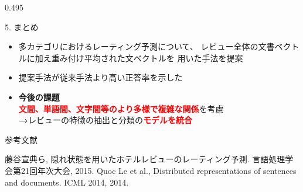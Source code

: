 \documentclass[unicode,10pt]{beamer}
\newcommand{\mycolumnwidth}{0.495\textwidth}
\newcommand{\arrow}{\textcolor{ttiblue}{\textbf{→}}\hspace{1ex}}
\newcommand{\itemtitle}[1]{\textbf{#1}\\}
\newcommand{\fire}[1]{\textcolor{red}{\textbf{#1}}}
\begin{document}
\begin{frame}
\begin{columns}[onlytextwidth,t]
\begin{column}{\mycolumnwidth}
  \begin{block}{5. まとめ}
    \begin{itemize}
      \item 多カテゴリにおけるレーティング予測について、
            レビュー全体の文書ベクトルに加え重み付け平均された文ベクトルを
            用いた手法を提案
      \item 提案手法が従来手法\cite{fujitani15}より高い正答率を示した
      \item \itemtitle{今後の課題}
            \fire{文間、単語間、文字間等のより多様で複雑な関係}を考慮 \\
            \arrow レビューの特徴の抽出と分類の\fire{モデルを統合}
    \end{itemize}
  \end{block}

  参考文献
  
  \begin{thebibliography}{9}
    藤谷宣典ら,
    隠れ状態を用いたホテルレビューのレーティング予測.
    言語処理学会第21回年次大会, 2015.
    Quoc Le et al.,
    Distributed representations of sentences and documents.
    ICML 2014, 2014.
  \end{thebibliography}
\end{column}

\end{columns}
\end{frame}
\end{document}
